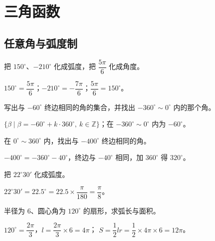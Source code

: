 \chapter{三角函数}

\section{任意角与弧度制}

\begin{problem}
把 $150^\circ$、$-210^\circ$ 化成弧度，把 $\dfrac{5\pi}{6}$ 化成角度。
\end{problem}
\begin{solution}
$150^\circ=\dfrac{5\pi}{6}$；$-210^\circ=-\dfrac{7\pi}{6}$；$\dfrac{5\pi}{6}=150^\circ$。
\end{solution}

\begin{problem}
写出与 $-60^\circ$ 终边相同的角的集合，并找出 $-360^\circ\sim0^\circ$ 内的那个角。
\end{problem}
\begin{solution}
$\{\beta\mid\beta=-60^\circ+k\cdot360^\circ,\ k\in\mathbb{Z}\}$；在 $-360^\circ\sim0^\circ$ 内为 $-60^\circ$。
\end{solution}

\begin{problem}
在 $0^\circ\sim360^\circ$ 内，找出与 $-400^\circ$ 终边相同的角。
\end{problem}
\begin{solution}
$-400^\circ=-360^\circ-40^\circ$，终边与 $-40^\circ$ 相同，加 $360^\circ$ 得 $320^\circ$。
\end{solution}

\begin{problem}
把 $22^\circ30'$ 化成弧度。
\end{problem}
\begin{solution}
$22^\circ30'=22.5^\circ=22.5\times\dfrac{\pi}{180}=\dfrac{\pi}{8}$。
\end{solution}

\begin{problem}
半径为 $6$、圆心角为 $120^\circ$ 的扇形，求弧长与面积。
\end{problem}
\begin{solution}
$120^\circ=\dfrac{2\pi}{3}$，$l=\dfrac{2\pi}{3}\times6=4\pi$；
$S=\dfrac12lr=\dfrac12\times4\pi\times6=12\pi$。
\end{solution}

